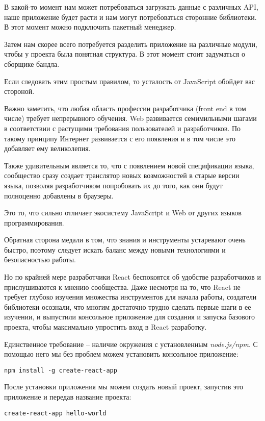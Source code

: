 В какой-то момент нам может потребоваться загружать данные с различных API, наше приложение будет расти и нам могут потребоваться сторонние библиотеки. В этот момент можно подключить пакетный менеджер.

Затем нам скорее всего потребуется разделить приложение на различные модули, чтобы у проекта была понятная структура. В этот момент стоит задуматься о сборщике бандла.

Если следовать этим простым правилом, то усталость от JavaScript обойдет вас стороной.

Важно заметить, что любая область профессии разработчика (front end в том числе) требует непрерывного обучения. Web развивается семимильными шагами в соответствии с растущими требования пользователей и разработчиков. По такому принципу Интернет развивается с его появления и в том числе это добавляет ему великолепия.

Также удивительным является то, что с появлением новой спецификации языка, сообщество сразу создает транслятор новых возможностей в старые версии языка, позволяя разработчиком попробовать их до того, как они будут полноценно добавлены в браузеры.

Это то, что сильно отличает экосистему JavaScript и Web от других языков программирования.

Обратная сторона медали в том, что знания и инструменты устаревают очень быстро, поэтому следует искать баланс между новыми технологиями и безопасностью работы.

Но по крайней мере разработчики React беспокоятся об удобстве разработчиков и прислушиваются к мнению сообщества. Даже несмотря на то, что React не требует глубоко изучения множества инструментов для начала работы, создатели библиотеки осознали, что многим достаточно трудно сделать первые шаги в ее изучении, и выпустили консольное приложение для создания и запуска базового проекта, чтобы максимально упростить вход в React разработку.

Единственное требование -- наличие окружения с установленным \textit{node.js/npm}. С помощью него мы без проблем можем установить консольное приложение:

\begin{lstlisting}
npm install -g create-react-app	
\end{lstlisting}

После установки приложения мы можем создать новый проект, запустив это приложение и передав название проекта:

\begin{lstlisting}
create-react-app hello-world
\end{lstlisting}

